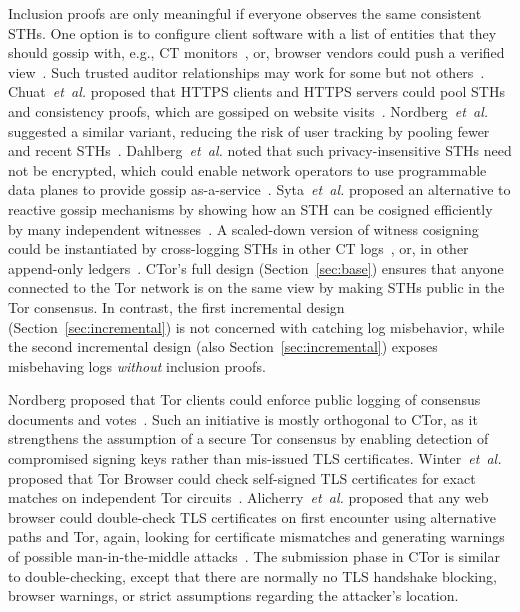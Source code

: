 Inclusion proofs are only meaningful if everyone observes the same consistent
STHs. One option is to configure client software with a list of entities that
they should gossip with, e.g., CT monitors~\cite{chase}, or, browser vendors
could push a verified view~\cite{sth-push}. Such trusted auditor relationships
may work for some but not others~\cite{nordberg}. Chuat~\emph{et~al.} proposed
that HTTPS clients and HTTPS servers could pool STHs and consistency proofs,
which are gossiped on website visits~\cite{chuat}. Nordberg~\emph{et~al.}
suggested a similar variant, reducing the risk of user tracking by pooling fewer
and recent STHs~\cite{nordberg}. Dahlberg~\emph{et~al.} noted that such
privacy-insensitive STHs need not be encrypted, which could enable network
operators to use programmable data planes to provide gossip
as-a-service~\cite{dahlberg}. Syta~\emph{et~al.} proposed an alternative to
reactive gossip mechanisms by showing how an STH can be cosigned efficiently by
many independent witnesses~\cite{syta}. A scaled-down version of witness
cosigning could be instantiated by cross-logging STHs in other CT
logs~\cite{minimal-gossip}, or, in other append-only ledgers~\cite{catena}.
CTor's full design (Section~\ref{sec:base}) ensures that anyone connected to the
Tor network is on the same view by making STHs public in the Tor consensus.  In
contrast, the first incremental design (Section~\ref{sec:incremental}) is not
concerned with catching log misbehavior, while the second incremental design
(also Section~\ref{sec:incremental}) exposes misbehaving logs \emph{without}
inclusion proofs.

Nordberg proposed that Tor clients could enforce public logging of consensus
documents and votes~\cite{consensus-transparency}.  Such an initiative is mostly
orthogonal to CTor, as it strengthens the assumption of a secure Tor consensus
by enabling detection of compromised signing keys rather than mis-issued TLS
certificates.  Winter~\emph{et~al.} proposed that Tor Browser could check
self-signed TLS certificates for exact matches on independent Tor
circuits~\cite{spoiled-onions}.  Alicherry~\emph{et~al.} proposed that any web
browser could double-check TLS certificates on first encounter using alternative
paths and Tor, again, looking for certificate mismatches and generating warnings
of possible man-in-the-middle attacks~\cite{doublecheck}.  The submission phase
in CTor is similar to double-checking, except that there are normally no TLS
handshake blocking, browser warnings, or strict assumptions regarding the
attacker's location.

